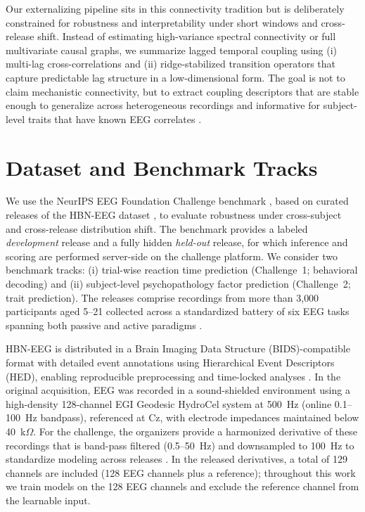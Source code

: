 \documentclass[12pt]{article}
\begin{document}
Our externalizing pipeline sits in this connectivity tradition but is deliberately constrained for robustness and
interpretability under short windows and cross-release shift. Instead of estimating high-variance spectral connectivity or
full multivariate causal graphs, we summarize lagged temporal coupling using (i) multi-lag cross-correlations and (ii)
ridge-stabilized transition operators that capture predictable lag structure in a low-dimensional form. The goal is not
to claim mechanistic connectivity, but to extract coupling descriptors that are stable enough to generalize across
heterogeneous recordings and informative for subject-level traits that have known EEG correlates
\citep{Iacono2003P300Externalizing,IaconoMalone2011P300Endophenotype}.

\section{Dataset and Benchmark Tracks}

We use the NeurIPS EEG Foundation Challenge benchmark \citep{EEGChallengeWebsite2025}, based on curated releases of the HBN-EEG dataset \citep{Shirazi2024HBNEEG}, to evaluate robustness under cross-subject and cross-release distribution shift. The benchmark provides a labeled \emph{development} release and a fully hidden \emph{held-out} release, for which inference and scoring are performed server-side on the challenge platform. We consider two benchmark tracks: (i) trial-wise reaction time prediction (Challenge~1; behavioral decoding) and (ii) subject-level psychopathology factor prediction (Challenge~2; trait prediction). The releases comprise recordings from more than 3{,}000 participants aged 5--21 collected across a standardized battery of six EEG tasks spanning both passive and active paradigms \citep{Shirazi2024HBNEEG,EEGChallengeWebsite2025}.

HBN-EEG is distributed in a Brain Imaging Data Structure (BIDS)-compatible format with detailed event annotations using Hierarchical Event Descriptors (HED), enabling reproducible
preprocessing and time-locked analyses \citep{Shirazi2024HBNEEG}. In the original acquisition, EEG was recorded in a
sound-shielded environment using a high-density 128-channel EGI Geodesic HydroCel system at 500~Hz
(online 0.1--100~Hz bandpass), referenced at Cz, with electrode impedances maintained below 40~k$\Omega$.
For the challenge, the organizers provide a harmonized derivative of these recordings that is band-pass filtered
(0.5--50~Hz) and downsampled to 100~Hz to standardize modeling across releases \citep{EEGChallengeWebsite2025}.
In the released derivatives, a total of 129 channels are included (128 EEG channels plus a reference); throughout this
work we train models on the 128 EEG channels and exclude the reference channel from the learnable input.
\end{document}
